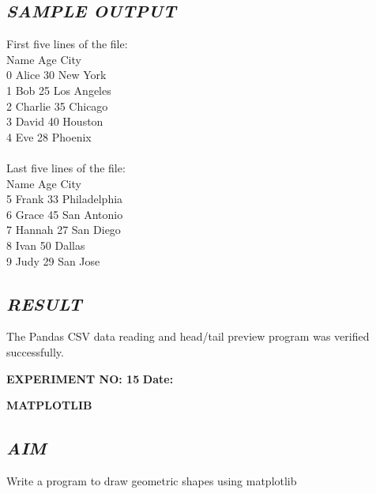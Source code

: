 \documentclass[11pt,a4paper]{article}
\begin{document}
\subsection*{\textit{SAMPLE OUTPUT}}
\begin{tcolorbox}[colback=black!85,colframe=navyblue,title=\textbf{Terminal Output},coltitle=white,fonttitle=\bfseries\small]
\small\ttfamily\color{green!30!white}
First five lines of the file:\\
      Name  Age         City\\
0    Alice   30     New York\\
1      Bob   25  Los Angeles\\
2  Charlie   35      Chicago\\
3    David   40      Houston\\
4      Eve   28      Phoenix\\
\\
Last five lines of the file:\\
     Name  Age         City\\
5   Frank   33  Philadelphia\\
6   Grace   45   San Antonio\\
7  Hannah   27     San Diego\\
8    Ivan   50        Dallas\\
9    Judy   29      San Jose
\end{tcolorbox}

\subsection*{\textit{RESULT}}
The Pandas CSV data reading and head/tail preview program was verified successfully.

\newpage

\noindent
\textbf{\large EXPERIMENT NO: 15} \hfill \textbf{\large Date: \underline{\hspace{3cm}}}

\vspace{0.2cm}
\begin{center}
{\Huge \textbf{\textcolor{navyblue}{MATPLOTLIB}}}
\end{center}
\vspace{0.3cm}

\subsection*{\textit{AIM}}
Write a program to draw geometric shapes using matplotlib
\end{document}
